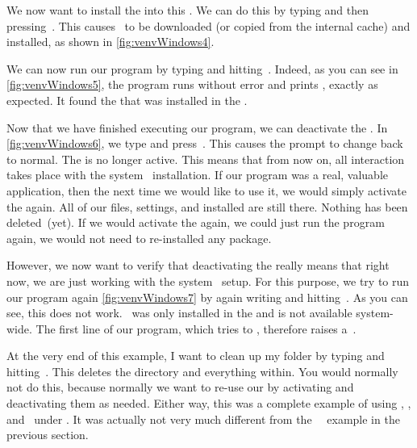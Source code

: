 We now want to install the \numpy{}  into this .
We can do this by typing  and then pressing~\keys{\return}.
This causes \numpy\ to be downloaded (or copied from the internal cache) and installed, as shown in \cref{fig:venvWindows4}.%
%
\begin{sloppypar}%
We can now run our program  by typing  and hitting~\keys{\return}.
Indeed, as you can see in \cref{fig:venvWindows5}, the program runs without error and prints , exactly as expected.
It found the \numpy{}  that was installed in the .%
\end{sloppypar}%
%
Now that we have finished executing our program, we can deactivate the .
In \cref{fig:venvWindows6}, we type  and press~\keys{\return}.
This causes the prompt to change back to normal.
The  is no longer active.
This means that from now on, all interaction takes place with the system \python\ installation.
If our program was a real, valuable application, then the next time we would like to use it, we would simply activate the  again.
All of our files, settings, and installed  are still there.
Nothing has been deleted~(yet).
If we would activate the  again, we could just run the program again, we would not need to re-installed any package.

However, we now want to verify that deactivating the  really means that right now, we are just working with the system \python\ setup.
For this purpose, we try to run our program again \cref{fig:venvWindows7} by again writing  and hitting~\keys{\return}.
As you can see, this does not work.
\numpy\ was only installed in the  and is not available system-wide.
The first line of our program, which tries to , therefore raises a~.

At the very end of this example, I want to clean up my folder by typing  and hitting~\keys{\return}.
This deletes the directory  and everything within.
You would normally not do this, because normally we want to re-use our  by activating and deactivating them as needed.
Either way, this was a complete example of using , \pip, and \venv\ under \microsoftWindows.
It was actually not very much different from the \ubuntu\ \linux\ example in the previous section.%
%
\endhsection%
%
\FloatBarrier
%
\endhsection%
%
